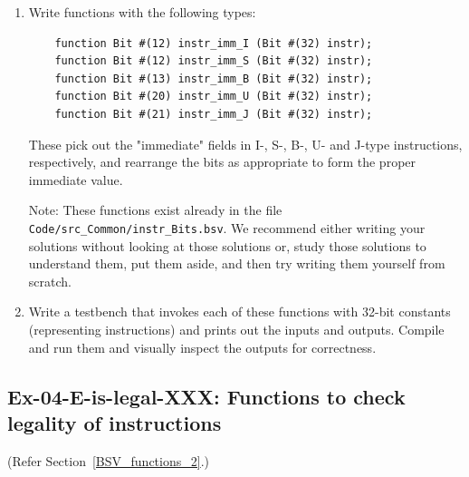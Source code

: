 \begin{enumerate}

  \item Write functions with the following types:

    \begin{verbatim}
    function Bit #(12) instr_imm_I (Bit #(32) instr);
    function Bit #(12) instr_imm_S (Bit #(32) instr);
    function Bit #(13) instr_imm_B (Bit #(32) instr);
    function Bit #(20) instr_imm_U (Bit #(32) instr);
    function Bit #(21) instr_imm_J (Bit #(32) instr);
    \end{verbatim}

    These pick out the "immediate" fields in I-, S-, B-, U- and J-type
    instructions, respectively, and rearrange the bits as appropriate
    to form the proper immediate value.

    Note: These functions exist already in the file
    \verb|Code/src_Common/instr_Bits.bsv|.  We recommend either
    writing your solutions without looking at those solutions or,
    study those solutions to understand them, put them aside, and then
    try writing them yourself from scratch.

  \item Write a testbench that invokes each of these functions with
    32-bit constants (representing instructions) and prints out the
    inputs and outputs.  Compile and run them and visually inspect the
    outputs for correctness.

\end{enumerate}


\subsection*{Ex-04-E-is-legal-XXX: Functions to check legality of instructions}
\label{Ex-04-E-is-legal-XXX}

(Refer Section~\ref{BSV_functions_2}.)

